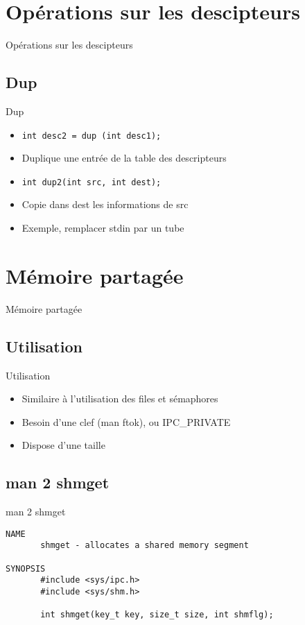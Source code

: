 \def\sectitle{Opérations sur les descipteurs}
\section{\sectitle}
\begin{frame}{\sectitle}
\def\subsectitle{Dup}
\subsection{\subsectitle}
\begin{block}{\subsectitle}
\begin{itemize}
    \item \texttt{int desc2 = dup (int desc1);}
    \item Duplique une entrée de la table des descripteurs
    \item \texttt{int dup2(int src, int dest);}
    \item Copie dans dest les informations de src
    \item Exemple, remplacer stdin par un tube
\end{itemize}
\end{block}
\end{frame}

\def\sectitle{Mémoire partagée}
\section{\sectitle}
\begin{frame}[containsverbatim]{\sectitle}
\def\subsectitle{Utilisation}
\subsection{\subsectitle}
\begin{block}{\subsectitle}
\begin{itemize}
    \item Similaire à l'utilisation des files et sémaphores
    \item Besoin d'une clef (man ftok), ou IPC\_PRIVATE
    \item Dispose d'une taille
\end{itemize}
\end{block}

\def\subsectitle{man 2 shmget}
\subsection{\subsectitle}
\begin{block} {\subsectitle}
\begin{verbatim}
NAME
       shmget - allocates a shared memory segment

SYNOPSIS
       #include <sys/ipc.h>
       #include <sys/shm.h>

       int shmget(key_t key, size_t size, int shmflg);
\end{verbatim}
\end{block} 
\end{frame}

